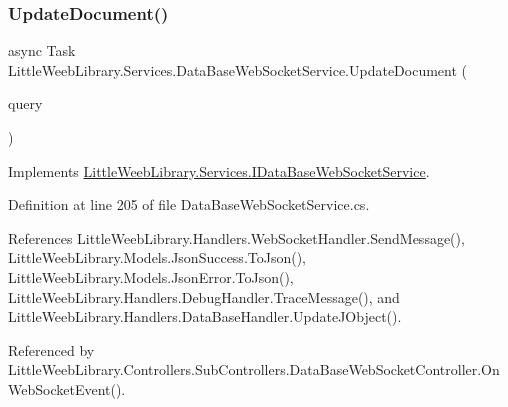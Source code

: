 \mbox{\label{class_little_weeb_library_1_1_services_1_1_data_base_web_socket_service_a3771a51f4d0aab2cd4f65676427d0902}} 
\subsubsection{\texorpdfstring{Update\+Document()}{UpdateDocument()}}
{\footnotesize\ttfamily async Task Little\+Weeb\+Library.\+Services.\+Data\+Base\+Web\+Socket\+Service.\+Update\+Document (\begin{DoxyParamCaption}\item[{J\+Object}]{query }\end{DoxyParamCaption})}



Implements \mbox{\hyperlink{interface_little_weeb_library_1_1_services_1_1_i_data_base_web_socket_service_a8b70c95afacce9abbd2d70c77b22c51a}{Little\+Weeb\+Library.\+Services.\+I\+Data\+Base\+Web\+Socket\+Service}}.



Definition at line 205 of file Data\+Base\+Web\+Socket\+Service.\+cs.



References Little\+Weeb\+Library.\+Handlers.\+Web\+Socket\+Handler.\+Send\+Message(), Little\+Weeb\+Library.\+Models.\+Json\+Success.\+To\+Json(), Little\+Weeb\+Library.\+Models.\+Json\+Error.\+To\+Json(), Little\+Weeb\+Library.\+Handlers.\+Debug\+Handler.\+Trace\+Message(), and Little\+Weeb\+Library.\+Handlers.\+Data\+Base\+Handler.\+Update\+J\+Object().



Referenced by Little\+Weeb\+Library.\+Controllers.\+Sub\+Controllers.\+Data\+Base\+Web\+Socket\+Controller.\+On\+Web\+Socket\+Event().


